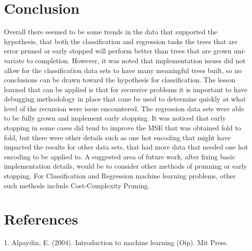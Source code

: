 \documentclass[twoside,11pt]{article}
\begin{document}
\section{Conclusion}
\hspace*{10mm} Overall there seemed to be some trends in the data that supported the hypothesis, that both the classification and regression tasks the trees that are error pruned or early stopped will perform better than trees that are grown uni-variate to completion. However, it was noted that implementation issues did not allow for the classification data sets to have many meaningful trees built, so no conclusions can be drawn toward the hypothesis for classification. The lesson learned that can be applied is that for recursive problems it is important to have debugging methodology in place that cane be used to determine quickly at what level of the recursion were issue encountered.\newline
\hspace*{10mm} The regression data sets were able to be fully grown and implement early stopping. It was noticed that early stopping in some cases did tend to improve the MSE that was obtained fold to fold, but there were other details such as one hot encoding that might have impacted the results for other data sets, that had more data that needed one hot encoding to be applied to.\newline
\hspace*{10mm} A suggested area of future work, after fixing basic implementation details, would be to consider other methods of prunning or early stopping. For Classification and Regression machine learning problems, other such methods include Cost-Complexity Pruning.\newline

\section{References}
1. Alpaydin, E. (2004). Introduction to machine learning (Oip). Mit Press. 

\newpage
\end{document}
